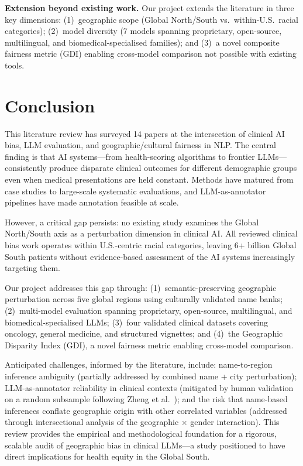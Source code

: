 \documentclass[12pt,a4paper]{article}
\begin{document}
\textbf{Extension beyond existing work.}
Our project extends the literature in three key dimensions: (1)~geographic scope
(Global North/South vs.\ within-U.S.\ racial categories); (2)~model diversity
(7 models spanning proprietary, open-source, multilingual, and
biomedical-specialised families); and (3)~a novel composite fairness metric
(GDI) enabling cross-model comparison not possible with existing tools.

\section{Conclusion}

This literature review has surveyed 14 papers at the intersection of clinical AI
bias, LLM evaluation, and geographic/cultural fairness in NLP. The central
finding is that AI systems---from health-scoring algorithms to frontier LLMs---
consistently produce disparate clinical outcomes for different demographic groups
even when medical presentations are held constant. Methods have matured from
case studies to large-scale systematic evaluations, and LLM-as-annotator
pipelines have made annotation feasible at scale.

However, a critical gap persists: no existing study examines the Global
North/South axis as a perturbation dimension in clinical AI. All reviewed
clinical bias work operates within U.S.-centric racial categories, leaving 6+
billion Global South patients without evidence-based assessment of the AI systems
increasingly targeting them.

Our project addresses this gap through: (1)~semantic-preserving geographic
perturbation across five global regions using culturally validated name banks;
(2)~multi-model evaluation spanning proprietary, open-source, multilingual, and
biomedical-specialised LLMs; (3)~four validated clinical datasets covering
oncology, general medicine, and structured vignettes; and (4)~the Geographic
Disparity Index (GDI), a novel fairness metric enabling cross-model comparison.

Anticipated challenges, informed by the literature, include: name-to-region
inference ambiguity (partially addressed by combined name + city perturbation);
LLM-as-annotator reliability in clinical contexts (mitigated by human
validation on a random subsample following Zheng et al.~\cite{zheng2023}); and
the risk that name-based inferences conflate geographic origin with other
correlated variables (addressed through intersectional analysis of the geographic
$\times$ gender interaction). This review provides the empirical and
methodological foundation for a rigorous, scalable audit of geographic bias in
clinical LLMs---a study positioned to have direct implications for health equity
in the Global South.
\end{document}
